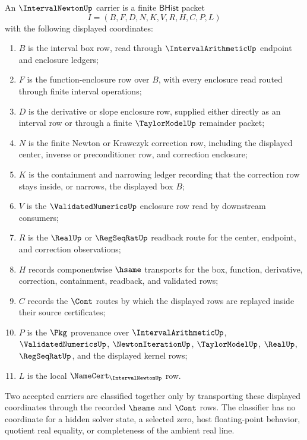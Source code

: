 \begin{definition}
\label{def:interval-newton-carrier}
An $\IntervalNewtonUp$ carrier is a finite $\mathsf{BHist}$ packet
$$
I=(B,F,D,N,K,V,R,H,C,P,L)
$$
with the following displayed coordinates:
\begin{enumerate}
\item $B$ is the interval box row, read through $\IntervalArithmeticUp$ endpoint and enclosure ledgers;
\item $F$ is the function-enclosure row over $B$, with every enclosure read routed through finite interval operations;
\item $D$ is the derivative or slope enclosure row, supplied either directly as an interval row or through a finite $\TaylorModelUp$ remainder packet;
\item $N$ is the finite Newton or Krawczyk correction row, including the displayed center, inverse or preconditioner row, and correction enclosure;
\item $K$ is the containment and narrowing ledger recording that the correction row stays inside, or narrows, the displayed box $B$;
\item $V$ is the $\ValidatedNumericsUp$ enclosure row read by downstream consumers;
\item $R$ is the $\RealUp$ or $\RegSeqRatUp$ readback route for the center, endpoint, and correction observations;
\item $H$ records componentwise $\hsame$ transports for the box, function, derivative, correction, containment, readback, and validated rows;
\item $C$ records the $\Cont$ routes by which the displayed rows are replayed inside their source certificates;
\item $P$ is the $\Pkg$ provenance over $\IntervalArithmeticUp$, $\ValidatedNumericsUp$, $\NewtonIterationUp$, $\TaylorModelUp$, $\RealUp$, $\RegSeqRatUp$, and the displayed kernel rows;
\item $L$ is the local $\NameCert_{\IntervalNewtonUp}$ row.
\end{enumerate}
Two accepted carriers are classified together only by transporting these displayed coordinates through the recorded $\hsame$ and $\Cont$ rows. The classifier has no coordinate for a hidden solver state, a selected zero, host floating-point behavior, quotient real equality, or completeness of the ambient real line.
\end{definition}

